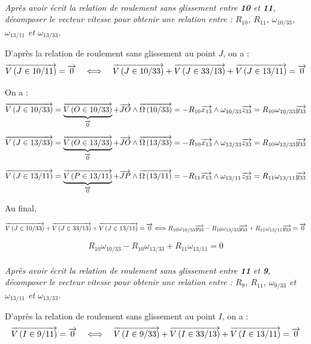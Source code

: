 \documentclass[11pt,oneside]{article}
\begin{document}
\paragraph{}
\textit{Après avoir écrit la relation de roulement sans glissement entre \textbf{10} et \textbf{11}, décomposer le vecteur vitesse pour obtenir une relation entre : $R_{10}$, $R_{11}$, $\omega_{10/33}$, $\omega_{13/11}$ et $\omega_{13/33}$.}


D'après la relation de roulement sans glissement au point $J$, on a : 
$$
\overrightarrow{V\left( {J} \in {10}/{11}\right)} = \overrightarrow{0} \quad \Longleftrightarrow \quad
\overrightarrow{V\left( {J} \in {10}/{33}\right)}+\overrightarrow{V\left( {J} \in {33}/{13}\right)}+\overrightarrow{V\left( {J} \in {13}/{11}\right)} = \overrightarrow{0} 
$$

On a :
$$
\overrightarrow{V\left( {J} \in {10}/{33}\right)} 
= \underbrace{\overrightarrow{V\left( {O} \in {10}/{33}\right)}}_{\overrightarrow{0}} + \overrightarrow{JO}\wedge \overrightarrow{\Omega\left( {10}/{33}\right)} 
= -R_{10} \overrightarrow{x_{13}}\wedge \omega_{10/33}\overrightarrow{z_{33}}
=R_{10} \omega_{10/33}\overrightarrow{y_{33}}
$$

$$
\overrightarrow{V\left( {J} \in {13}/{33}\right)} 
= \underbrace{\overrightarrow{V\left( {O} \in {13}/{33}\right)}}_{\overrightarrow{0}} + \overrightarrow{JO}\wedge \overrightarrow{\Omega\left( {13}/{33}\right)} 
= -R_{10} \overrightarrow{x_{13}}\wedge \omega_{13/33}\overrightarrow{z_{33}}
=R_{10} \omega_{13/33}\overrightarrow{y_{33}}
$$

$$
\overrightarrow{V\left( {J} \in {13}/{11}\right)} 
= \underbrace{\overrightarrow{V\left( {P} \in {13}/{11}\right)}}_{\overrightarrow{0}} + \overrightarrow{JP}\wedge \overrightarrow{\Omega\left( {13}/{11}\right)} 
= -R_{11} \overrightarrow{x_{13}}\wedge \omega_{13/11}\overrightarrow{z_{33}}
=R_{11} \omega_{13/11}\overrightarrow{y_{33}}
$$

Au final, 

$$
\overrightarrow{V\left( {J} \in {10}/{33}\right)}+\overrightarrow{V\left( {J} \in {33}/{13}\right)}+\overrightarrow{V\left( {J} \in {13}/{11}\right)} = \overrightarrow{0} 
\Longleftrightarrow
R_{10} \omega_{10/33}\overrightarrow{y_{33}} - R_{10} \omega_{13/33}\overrightarrow{y_{33}} +R_{11} \omega_{13/11}\overrightarrow{y_{33}}
= \overrightarrow{0} 
$$

$$
R_{10} \omega_{10/33}- R_{10} \omega_{13/33} +R_{11} \omega_{13/11}=0
$$



\paragraph{}
\textit{Après avoir écrit la relation de roulement sans glissement entre \textbf{11} et \textbf{9}, décomposer le vecteur vitesse pour obtenir une relation entre : $R_9$, $R_{11}$, $\omega_{9/33}$ et $\omega_{13/11}$ et $\omega_{13/33}$.}










D'après la relation de roulement sans glissement au point $I$, on a : 
$$
\overrightarrow{V\left( {I} \in {9}/{11}\right)} = \overrightarrow{0} \quad \Longleftrightarrow \quad
\overrightarrow{V\left( {I} \in {9}/{33}\right)}+\overrightarrow{V\left( {I} \in {33}/{13}\right)}+\overrightarrow{V\left( {I} \in {13}/{11}\right)} = \overrightarrow{0} 
$$
\end{document}
